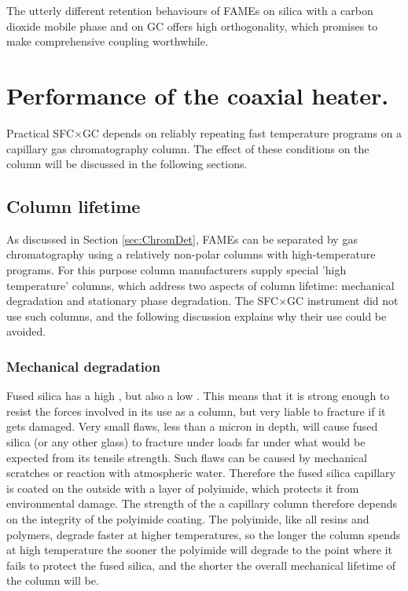 
The utterly different retention behaviours of FAMEs on silica with a carbon
dioxide mobile phase and on GC offers high orthogonality, which promises to make
comprehensive coupling worthwhile.

\section[Coaxial heater performance.]{Performance of the coaxial heater.}

Practical SFC×GC depends on reliably repeating fast temperature programs on a
capillary gas chromatography column. The effect of these conditions on the
column will be discussed in the following sections.

\subsection{Column lifetime}

As discussed in Section \ref{sec:ChromDet}, FAMEs can be separated by gas
chromatography using a relatively non-polar columns with high-temperature
programs. For this purpose column manufacturers supply special 'high
temperature' columns, which address two aspects of column lifetime: mechanical
degradation and stationary phase degradation. The SFC×GC instrument did not use
such columns, and the following discussion explains why their use could be
avoided.

\subsubsection{Mechanical degradation}
Fused silica has a high , but also a low
. This means that it is strong enough to resist the
forces involved in its use as a column, but very liable to fracture if it gets
damaged. Very small flaws, less than a micron in depth, will cause fused silica
(or any other glass) to fracture under loads far under what would be expected
from its tensile strength. Such flaws can be caused by mechanical scratches or
reaction with atmospheric water. Therefore the fused silica capillary is coated
on the outside with a layer of polyimide, which protects it from environmental
damage. The strength of the a capillary column therefore depends on the
integrity of the polyimide coating. The polyimide, like all resins and polymers,
degrade faster at higher temperatures, so the longer the column spends at high
temperature the sooner the polyimide will degrade to the point where it fails
to protect the fused silica, and the shorter the overall mechanical lifetime of
the column will be.

